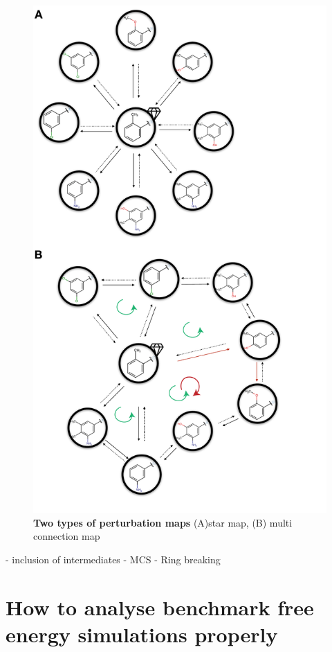 \documentclass[9pt,bestpractices]{livecoms}
\begin{document}
\begin{figure}
    \includegraphics[width=0.95\linewidth]{figures/network.pdf}
    \caption{\textbf{Two types of perturbation maps} (A)star map, (B) multi connection map}
    \label{fig:map}
\end{figure}

- inclusion of intermediates
- MCS
- Ring breaking


\section{How to analyse benchmark free energy simulations properly}
\end{document}
